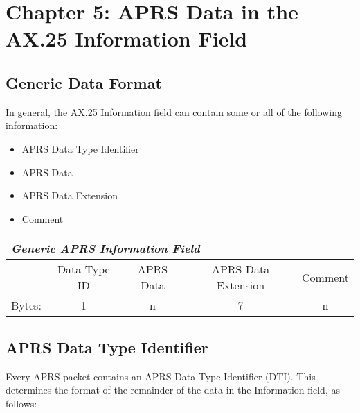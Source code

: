 \chapter {Chapter 5: APRS Data in the AX.25 Information Field}

\section {Generic Data Format}

In general, the AX.25 Information field can contain some or all of the
following information:
\begin{itemize}
\item  APRS Data Type Identifier
\item  APRS Data
\item  APRS Data Extension
\item  Comment
\end{itemize}


\begin{tabular}{|l|c|c|c|c|}
  \hline
  \multicolumn{5}{|l|}{\bf\it{Generic APRS Information Field}} \\
  \hline
  & Data Type ID & APRS Data & APRS Data Extension & Comment \\
  \hline 
  Bytes: & 1            & n         & 7                   & n \\
  \hline
\end{tabular}



\section{APRS Data Type Identifier}

Every APRS packet contains an APRS Data Type Identifier (DTI). This
determines the format of the remainder of the data in the Information field, as
follows:



